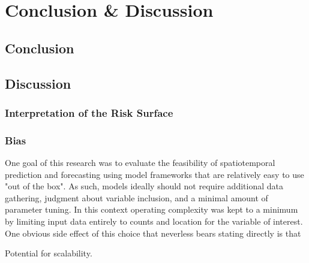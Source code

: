\section{Conclusion & Discussion}
\label{discussion}

\subsection{Conclusion}




\subsection{Discussion}

\subsubsection{Interpretation of the Risk Surface}


\subsubsection{Bias}

One goal of this research was to evaluate the feasibility of spatiotemporal prediction and forecasting using model frameworks that are relatively easy to use "out of the box". As such, models ideally should not require additional data gathering, judgment about variable inclusion, and a minimal amount of parameter tuning. In this context operating complexity was kept to a minimum by limiting input data entirely to counts and location for the variable of interest.  One obvious side effect of this choice that neverless bears stating directly is that

Potential for scalability.
